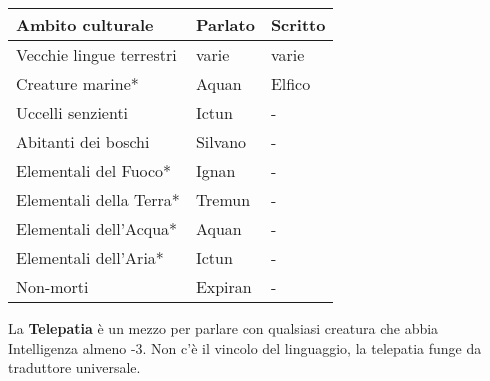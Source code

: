 \begin{multicols}{2}
{\noindent\begin{tabularx}{\linewidth}{lXX}
		\toprule
\rowcolor{gray!20}\textbf{Ambito culturale}& \textbf{Parlato} & \textbf{Scritto}\\
\toprule
Vecchie lingue terrestri& varie & varie\\
\rowcolor{gray!20}Creature marine* & Aquan& Elfico\\
Uccelli senzienti& Ictun & -\\
\rowcolor{gray!20}Abitanti dei boschi& Silvano& - \\
Elementali del Fuoco* & Ignan&-\\
\rowcolor{gray!20}Elementali della Terra*& Tremun &-\\
Elementali dell'Acqua* & Aquan & - \\
\rowcolor{gray!20}Elementali dell'Aria*& Ictun &-\\
Non-morti & Expiran & - \\
\end{tabularx}}

\medskip

La \textbf{Telepatia} è un mezzo per parlare con qualsiasi creatura che abbia Intelligenza almeno -3. Non c'è il vincolo del linguaggio, la telepatia funge da traduttore universale.

%


\end{multicols}

\pagebreak

